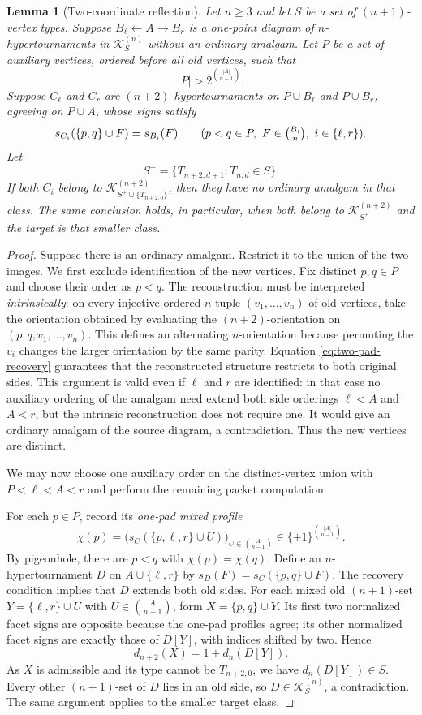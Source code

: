 \documentclass[11pt,a4paper]{article}
\newtheorem{lemma}[theorem]{Lemma}
\theoremstyle{remark}
\newcommand{\K}{\mathcal K}
\begin{document}
\begin{lemma}[Two-coordinate reflection]\label{lem:reflection}
Let $n\ge3$ and let $S$ be a set of $(n+1)$-vertex types.
Suppose $B_\ell\leftarrow A\rightarrow B_r$ is a one-point
diagram of $n$-hypertournaments in $\K^{(n)}_S$ without an ordinary
amalgam. Let $P$ be a set of auxiliary vertices, ordered before all
old vertices, such that
\[
 |P|>2^{\binom{|A|}{n-1}}.
\]
Suppose $C_\ell$ and $C_r$ are $(n+2)$-hypertournaments on
$P\cup B_\ell$ and $P\cup B_r$, agreeing on $P\cup A$,
whose signs satisfy
\begin{equation}\label{eq:two-pad-recovery}
 s_{C_i}(\{p,q\}\cup F)=s_{B_i}(F)
 \qquad(p<q\in P,\ F\in\tbinom{B_i}n,\ i\in\{\ell,r\}).
\end{equation}
Let
\[
 S^+=\{T_{n+2,d+1}:T_{n,d}\in S\}.
\]
If both $C_i$ belong to
$\K^{(n+2)}_{S^+\cup\{T_{n+2,0}\}}$, then they have no ordinary
amalgam in that class. The same conclusion holds, in particular,
when both belong to $\K^{(n+2)}_{S^+}$ and the target is that smaller class.
\end{lemma}
\begin{proof}
Suppose there is an ordinary amalgam. Restrict it to the union
of the two images. We first exclude identification of the new
vertices. Fix distinct $p,q\in P$ and choose their order as $p<q$.
The reconstruction must be interpreted \emph{intrinsically}:
on every injective ordered $n$-tuple $(v_1,\ldots,v_n)$ of old
vertices, take the orientation obtained by evaluating the
$(n+2)$-orientation on $(p,q,v_1,\ldots,v_n)$.
This defines an alternating $n$-orientation because permuting the
$v_i$ changes the larger orientation by the same parity. Equation
\eqref{eq:two-pad-recovery} guarantees that the reconstructed
structure restricts to both original sides. This argument is valid
even if $\ell$ and $r$ are identified: in that case no auxiliary
ordering of the amalgam need extend both side orderings
$\ell<A$ and $A<r$, but the intrinsic reconstruction does not
require one. It would give an ordinary amalgam of the source
diagram, a contradiction. Thus the new vertices are distinct.

We may now choose one auxiliary order on the distinct-vertex union
with $P<\ell<A<r$ and perform the remaining packet computation.

For each $p\in P$, record its \emph{one-pad mixed profile}
\[
 \chi(p)=\bigl(s_C(\{p,\ell,r\}\cup U)\bigr)_
 {U\in\binom A{n-1}}\in\{\pm1\}^{\binom{|A|}{n-1}}.
\]
By pigeonhole, there are $p<q$ with $\chi(p)=\chi(q)$.
Define an $n$-hypertournament $D$ on $A\cup\{\ell,r\}$ by
$s_D(F)=s_C(\{p,q\}\cup F)$. The recovery condition implies
that $D$ extends both old sides. For each mixed old
$(n+1)$-set $Y=\{\ell,r\}\cup U$ with
$U\in\binom A{n-1}$, form $X=\{p,q\}\cup Y$.
Its first two normalized facet signs are opposite because the
one-pad profiles agree; its other normalized facet signs are
exactly those of $D[Y]$, with indices shifted by two. Hence
\[
 d_{n+2}(X)=1+d_n(D[Y]).
\]
As $X$ is admissible and its type cannot be $T_{n+2,0}$,
we have $d_n(D[Y])\in S$. Every other $(n+1)$-set of $D$
lies in an old side, so $D\in\K^{(n)}_S$, a contradiction.
The same argument applies to the smaller target class.
\end{proof}
\end{document}
